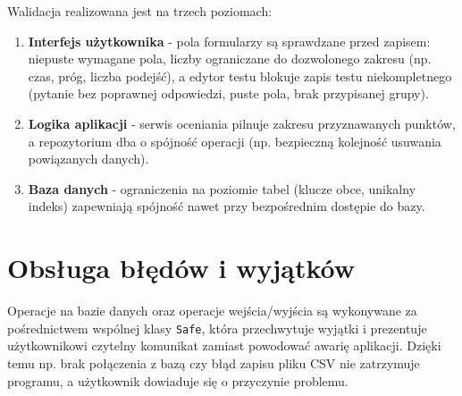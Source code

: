 Walidacja realizowana jest na trzech poziomach:

\begin{enumerate}
  \item \textbf{Interfejs użytkownika} - pola formularzy są sprawdzane przed zapisem: niepuste
        wymagane pola, liczby ograniczane do dozwolonego zakresu (np. czas, próg, liczba podejść),
        a edytor testu blokuje zapis testu niekompletnego (pytanie bez poprawnej odpowiedzi, puste
        pola, brak przypisanej grupy).
  \item \textbf{Logika aplikacji} - serwis oceniania pilnuje zakresu przyznawanych punktów, a
        repozytorium dba o spójność operacji (np. bezpieczną kolejność usuwania powiązanych danych).
  \item \textbf{Baza danych} - ograniczenia na poziomie tabel (klucze obce, unikalny indeks)
        zapewniają spójność nawet przy bezpośrednim dostępie do bazy.
\end{enumerate}

\section{Obsługa błędów i wyjątków}
\label{sec:bledy}

Operacje na bazie danych oraz operacje wejścia/wyjścia są wykonywane za pośrednictwem wspólnej klasy
\texttt{Safe}, która przechwytuje wyjątki i prezentuje użytkownikowi czytelny komunikat zamiast
powodować awarię aplikacji. Dzięki temu np. brak połączenia z bazą czy błąd zapisu pliku CSV nie
zatrzymuje programu, a użytkownik dowiaduje się o przyczynie problemu.
